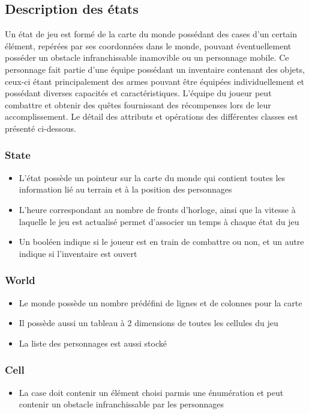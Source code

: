 \documentclass[a4paper,12pt]{article}
\begin{document}
\subsection{Description des états}
Un état de jeu est formé de la carte du monde possédant des cases d'un certain élément, repérées par ses coordonnées dans le monde, pouvant éventuellement posséder un obstacle infranchissable inamovible ou un personnage mobile. Ce personnage fait partie d'une équipe possédant un inventaire contenant des objets, ceux-ci étant principalement des armes pouvant être équipées individuellement et possédant diverses capacités et caractéristiques. L'équipe du joueur peut combattre et obtenir des quêtes fournissant des récompenses lors de leur accomplissement.
Le détail des attributs et opérations des différentes classes est présenté ci-dessous.

\subsubsection{State}
\begin{itemize}
\item L'état possède un pointeur sur la carte du monde qui contient toutes les information lié au terrain et à la position des personnages
\item L'heure correspondant au nombre de fronts d'horloge, ainsi que la vitesse à laquelle le jeu est actualisé permet d'associer un temps à chaque état du jeu
\item Un booléen indique si le joueur est en train de combattre ou non, et un autre indique si l'inventaire est ouvert
\end{itemize}

\subsubsection{World}
\begin{itemize}
\item Le monde possède un nombre prédéfini de lignes et de colonnes pour la carte
\item Il possède aussi un tableau à 2 dimensions de toutes les cellules du jeu
\item La liste des personnages est aussi stocké
\end{itemize}

\subsubsection{Cell}
\begin{itemize}
\item La case doit contenir un élément choisi parmis une énumération et peut contenir un obstacle infranchissable par les personnages
\end{itemize}
\end{document}
